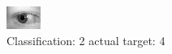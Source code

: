 \begin{figure}[h!]
\begin{center}
\includegraphics[width=0.60\columnwidth]{figures/ID832_class_2_target_4.png}
\end{center}
\caption{ Classification: 2 actual target: 4}
\label{fig:ID832_class_2_target_4}
\end{figure}
